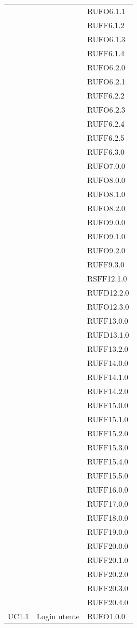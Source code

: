 \begin{center}
\begin{longtable}{lp{}l}
 &  & RUFO6.1.1 \\
 &  & RUFF6.1.2 \\
 &  & RUFO6.1.3 \\
 &  & RUFF6.1.4 \\
 &  & RUFO6.2.0 \\
 &  & RUFO6.2.1 \\
 &  & RUFF6.2.2 \\
 &  & RUFO6.2.3 \\
 &  & RUFF6.2.4 \\
 &  & RUFF6.2.5 \\
 &  & RUFF6.3.0 \\
 &  & RUFO7.0.0 \\
 &  & RUFO8.0.0 \\
 &  & RUFO8.1.0 \\
 &  & RUFO8.2.0 \\
 &  & RUFO9.0.0 \\
 &  & RUFO9.1.0 \\
 &  & RUFO9.2.0 \\
 &  & RUFF9.3.0 \\
 &  & RSFF12.1.0 \\
 &  & RUFD12.2.0 \\
 &  & RUFO12.3.0 \\
 &  & RUFF13.0.0 \\
 &  & RUFD13.1.0 \\
 &  & RUFF13.2.0 \\
 &  & RUFF14.0.0 \\
 &  & RUFF14.1.0 \\
 &  & RUFF14.2.0 \\
 &  & RUFF15.0.0 \\
 &  & RUFF15.1.0 \\
 &  & RUFF15.2.0 \\
 &  & RUFF15.3.0 \\
 &  & RUFF15.4.0 \\
 &  & RUFF15.5.0 \\
 &  & RUFF16.0.0 \\
 &  & RUFF17.0.0 \\
 &  & RUFF18.0.0 \\
 &  & RUFF19.0.0 \\
 &  & RUFF20.0.0 \\
 &  & RUFF20.1.0 \\
 &  & RUFF20.2.0 \\
 &  & RUFF20.3.0 \\
 &  & RUFF20.4.0 \\
UC1.1 & Login utente & RUFO1.0.0 \\

\end{longtable}
\end{center}
